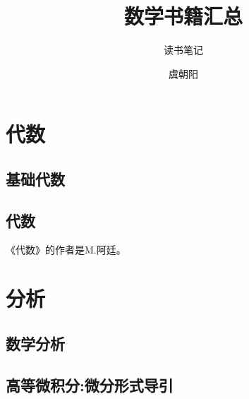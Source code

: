 \documentclass[cn,11pt,chinese]{elegantbook}
\title{数学书籍汇总}
\subtitle{读书笔记}
\author{虞朝阳}
\institute{西北工业大学}
\numberwithin{equation}{section}
\begin{document}
\maketitle



\tableofcontents
\mainmatter
\hypersetup{pageanchor=true}

\part{代数}



\chapter{基础代数}


\chapter{代数}
 《代数》的作者是M.阿廷。

\part{分析}
\chapter{数学分析}


\chapter{高等微积分:微分形式导引}



% 

\appendix
\end{document}

